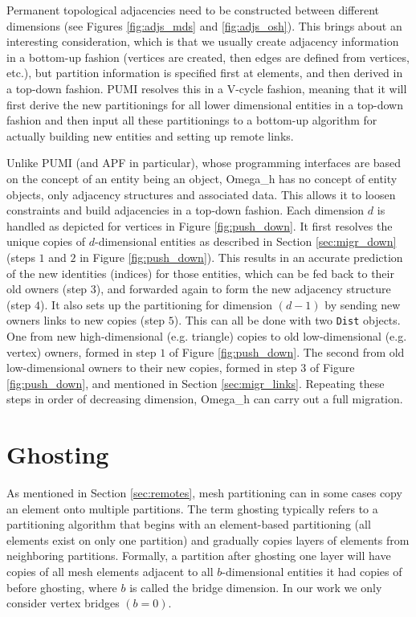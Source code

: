 Permanent topological adjacencies need to be constructed
between different dimensions (see Figures \ref{fig:adjs_mds} and
\ref{fig:adjs_osh}).
This brings about an interesting consideration, which is that we
usually create adjacency information in a bottom-up fashion (vertices
are created, then edges are defined from vertices, etc.), but
partition information is specified first at elements, and then
derived in a top-down fashion.
PUMI resolves this in a V-cycle fashion, meaning that it will first
derive the new partitionings for all lower dimensional entities in a top-down
fashion and then input all these partitionings to a bottom-up algorithm
for actually building new entities and setting up remote links.

Unlike PUMI (and APF in particular), whose programming interfaces are based on the
concept of an entity being an object, Omega\_h has no concept of entity
objects, only adjacency structures and associated data.
This allows it to loosen constraints and build adjacencies in a top-down fashion.
Each dimension $d$ is handled as depicted for vertices in Figure \ref{fig:push_down}.
It first resolves the unique copies of
$d$-dimensional entities as described in Section \ref{sec:migr_down}
(steps $1$ and $2$ in Figure \ref{fig:push_down}).
This results in an accurate prediction of the new identities (indices)
for those entities, which can be fed back to
their old owners (step $3$), and forwarded
again to form the new adjacency structure (step $4$).
It also sets up the partitioning for dimension $(d-1)$ by sending
new owners links to new copies (step $5$).
This can all be done with two \texttt{Dist} objects.
One from new
high-dimensional (e.g. triangle) copies to old low-dimensional (e.g. vertex) owners,
formed in step $1$ of Figure \ref{fig:push_down}.
The second from old low-dimensional owners to their new copies,
formed in step $3$ of Figure \ref{fig:push_down}, and
mentioned in Section \ref{sec:migr_links}.
Repeating these steps in order of decreasing dimension, Omega\_h
can carry out a full migration.

\section{Ghosting}
\label{sec:ghost}

As mentioned in Section \ref{sec:remotes}, mesh partitioning can
in some cases copy an element onto multiple partitions.
The term ghosting typically refers to a partitioning algorithm
that begins with an element-based partitioning (all elements
exist on only one partition) and gradually copies layers of elements
from neighboring partitions.
Formally, a partition after ghosting one layer will have copies
of all mesh elements adjacent to all $b$-dimensional entities
it had copies of before ghosting, where $b$ is called the bridge dimension.
In our work we only consider vertex bridges $(b=0)$.

